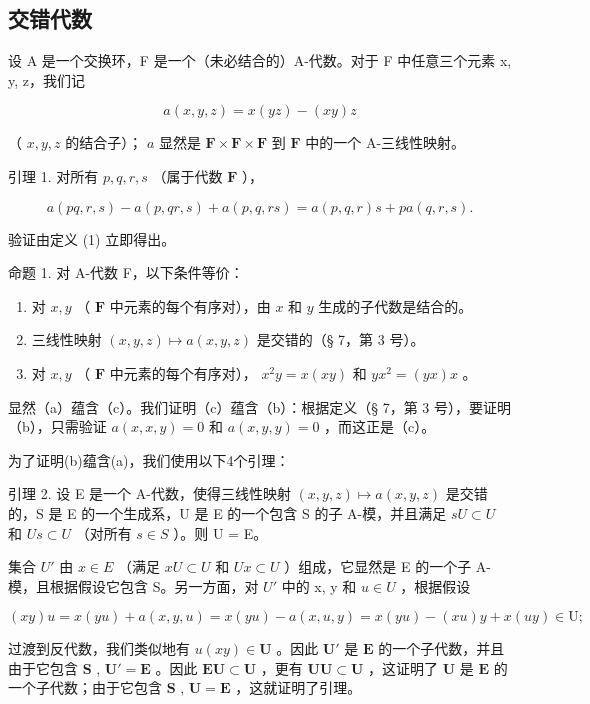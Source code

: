 \subsection{交错代数}

设 A 是一个交换环，F 是一个（未必结合的）A-代数。对于 F 中任意三个元素 x, y, z，我们记

\[
a (x, y, z) = x (y z) - (x y) z\tag{1}
\]

（ \(x, y, z\) 的结合子）； \(a\) 显然是 \(\mathbf{F} \times \mathbf{F} \times \mathbf{F}\) 到 \(\mathbf{F}\) 中的一个 A-三线性映射。

引理 1. 对所有 \(p, q, r, s\) （属于代数 \(\mathbf{F}\) ），

\[
a (p q, r, s) - a (p, q r, s) + a (p, q, r s) = a (p, q, r) s + p a (q, r, s).\tag{2}
\]

验证由定义 (1) 立即得出。

命题 1. 对 A-代数 F，以下条件等价：

\begin{enumerate}
\def\labelenumi{(\alph{enumi})}
\item
  对 \(x, y\) （ \(\mathbf{F}\) 中元素的每个有序对），由 \(x\) 和 \(y\) 生成的子代数是结合的。
\item
  三线性映射 \((x, y, z) \mapsto a(x, y, z)\) 是交错的（§ 7，第 3 号）。
\item
  对 \(x, y\) （ \(\mathbf{F}\) 中元素的每个有序对）， \(x^2y = x(xy)\) 和 \(yx^2 = (yx)x\) 。
\end{enumerate}

显然（a）蕴含（c）。我们证明（c）蕴含（b）：根据定义（§ 7，第 3 号），要证明（b），只需验证 \(a(x, x, y) = 0\) 和 \(a(x, y, y) = 0\) ，而这正是（c）。

为了证明(b)蕴含(a)，我们使用以下4个引理：

引理 2. 设 E 是一个 A-代数，使得三线性映射 \((x,y,z)\mapsto a(x,y,z)\) 是交错的，S 是 E 的一个生成系，U 是 E 的一个包含 S 的子 A-模，并且满足 \(sU\subset U\) 和 \(Us\subset U\) （对所有 \(s\in S\) ）。则 U = E。

集合 \(U'\) 由 \(x \in E\) （满足 \(xU \subset U\) 和 \(Ux \subset U\) ）组成，它显然是 E 的一个子 A-模，且根据假设它包含 S。另一方面，对 \(U'\) 中的 x, y 和 \(u \in U\) ，根据假设

\[
(x y) u = x (y u) + a (x, y, u) = x (y u) - a (x, u, y) = x (y u) - (x u) y + x (u y) \in \mathrm{U};
\]

过渡到反代数，我们类似地有 \(u(xy) \in \mathbf{U}\) 。因此 \(\mathbf{U}'\) 是 \(\mathbf{E}\) 的一个子代数，并且由于它包含 \(\mathbf{S}\) , \(\mathbf{U}' = \mathbf{E}\) 。因此 \(\mathbf{EU} \subset \mathbf{U}\) ，更有 \(\mathbf{UU} \subset \mathbf{U}\) ，这证明了 \(\mathbf{U}\) 是 \(\mathbf{E}\) 的一个子代数；由于它包含 \(\mathbf{S}\) , \(\mathbf{U} = \mathbf{E}\) ，这就证明了引理。

